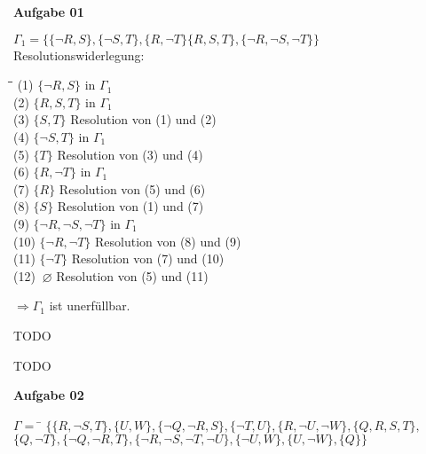 \documentclass[a4paper,10pt]{article}
\begin{document}
	\parindent0pt
	\textbf{Aufgabe 01}
	\begin{compactenum} [(a)]
		\item $ \Gamma_1 = \{\{\lnot R,S\}, \{\lnot S, T\}, \{R,\lnot T\} \{R,S,T\},\{ \lnot R, \lnot S, \lnot T \} \} $ \\
		
		Resolutionswiderlegung:
		\begin{tabbing}
			\= \qquad \= \qquad\qquad\qquad \= \qquad\qquad \kill
			\>(1) \> $ \{\lnot R, S \} $ \> in $ \Gamma_1 $ \\
			\>(2) \> $ \{R, S, T\} $ \> in $ \Gamma_1 $ \\
			\>(3) \> $ \{S,T \} $ \> Resolution von (1) und (2) \\
			\>(4) \> $ \{\lnot S, T\} $ \> in $ \Gamma_1 $\\
			\>(5) \> $ \{T\} $ \> Resolution von (3) und (4) \\
			\>(6) \> $ \{R, \lnot T\} $ \> in $ \Gamma_1 $\\
			\>(7) \> $ \{R\} $ \> Resolution von (5) und (6) \\
			\>(8) \> $ \{S\} $ \> Resolution von (1) und (7) \\
			\>(9) \> $ \{\lnot R, \lnot S, \lnot T\} $ \> in $ \Gamma_1 $ \\
			\>(10) \> $ \{\lnot R, \lnot T\} $ \> Resolution von (8) und (9) \\
			\>(11) \> $ \{\lnot T\} $ \> Resolution von (7) und (10)\\
			\>(12) \> $ \ \varnothing $ \> Resolution von (5) und (11) 
		\end{tabbing}
		$ \Rightarrow \Gamma_1 $ ist unerfüllbar. \\
		
		\item TODO
		\item TODO
	\end{compactenum}
	\newpage
	\textbf{Aufgabe 02}
	\begin{tabbing}
			$ \Gamma = $ \= $ \{\{R,\lnot S,T\},\{U,W\},\{\lnot Q,\lnot R,S\},\{\lnot T,U\},\{R,\lnot U,\lnot W\},\{Q,R,S,T\}, $ \\
			\> $ \{Q,\lnot T\},\{\lnot Q, \lnot R,T\},\{\lnot R,\lnot S,\lnot T,\lnot U\},\{\lnot U,W\},\{U,\lnot W\},\{Q\}\} $
	\end{tabbing}
\end{document}
